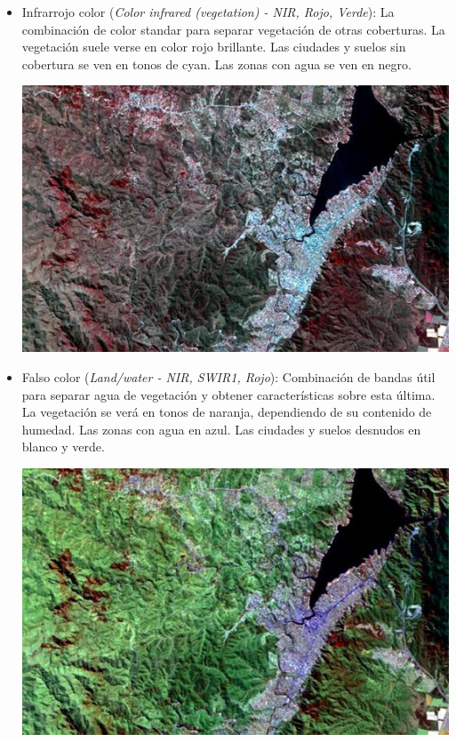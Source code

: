 \documentclass[a4paper,12pt]{book}
\begin{document}
\begin{itemize}
    \item Infrarrojo color (\emph{Color infrared (vegetation) - NIR, Rojo, Verde}): La combinación de color standar para separar vegetación de otras coberturas. La vegetación suele verse en color rojo brillante. Las ciudades y suelos sin cobertura se ven en tonos de cyan. Las zonas con agua se ven en negro.
    \begin{center}\includegraphics[scale=0.4]{8-4-3.jpeg}\end{center}
    \item Falso color (\emph{Land/water - NIR, SWIR1, Rojo}): Combinación de bandas útil para separar agua de vegetación y obtener características sobre esta última. La vegetación se verá en tonos de naranja, dependiendo de su contenido de humedad. Las zonas con agua en azul. Las ciudades y suelos desnudos en blanco y verde.
    \begin{center}\includegraphics[scale=0.4]{8-11-4.jpeg}\end{center}
\end{itemize}
\end{document}
